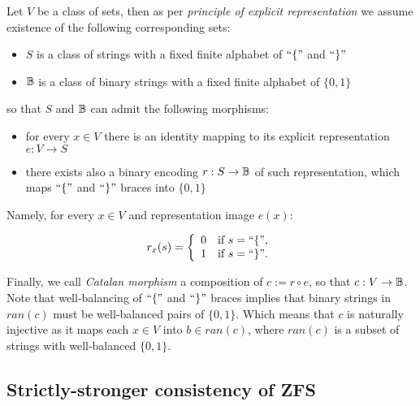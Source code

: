 \begin{definition}\label{def_katalan_morph}
  Let $V$ be a class of sets, then as per \textit{principle of explicit representation} we assume existence of the following corresponding sets:
  
  \begin{itemize}
    \item $S$ is a class of strings with a fixed finite alphabet of $\text{``}\{\text{''}$ and $\text{``}\}\text{''}$ 
    \item $\mathbb{B}$ is a class of binary strings with a fixed finite alphabet of $\{0,1\}$
  \end{itemize}

  so that $S$ and $\mathbb{B}$ can admit the following morphisms:

  \begin{itemize}
    \item for every $x \in V$ there is an identity mapping to its explicit representation $e: V \to S$ 
    \item there exists also a binary encoding $r: S \to \mathbb{B}$ of such representation, which maps $\text{``}\{\text{''}$ and $\text{``}\}\text{''}$ braces into $\{0,1\}$
  \end{itemize}

  Namely, for every $x \in V$ and representation image $e(x)$:

  \begin{align*}
    r_x(s)=\left\{
      \begin{array}{ll}
        0 & \mbox{if $s = \text{``}\{\text{''}$,}\\
        1 & \mbox{if $s = \text{``}\}\text{''}$.}
      \end{array}
    \right.
  \end{align*}

  Finally, we call \textit{Catalan morphism} a composition of $c := r \circ e$, so that $c: V \to \mathbb{B}$. Note that well-balancing of $\text{``}\{\text{''}$ and $\text{``}\}\text{''}$ braces implies that binary strings in $ran(c)$ must be well-balanced pairs of $\{0,1\}$. Which means that $c$ is naturally injective as it maps each $x \in V$ into $b \in ran(c)$, where $ran(c)$ is a subset of strings with well-balanced $\{0,1\}$.
\end{definition}



\subsection{Strictly-stronger consistency of ZFS}

